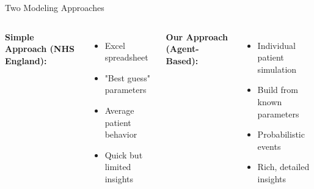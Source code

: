 \documentclass[10pt,aspectratio=169]{beamer}
\begin{document}
\begin{frame}{Two Modeling Approaches}
\begin{columns}[T]
\textbf{Simple Approach (NHS England):}
\begin{itemize}
    \item Excel spreadsheet
    \item "Best guess" parameters
    \item Average patient behavior
    \item Quick but limited insights
\end{itemize}

\textbf{Our Approach (Agent-Based):}
\begin{itemize}
    \item Individual patient simulation
    \item Build from known parameters
    \item Probabilistic events
    \item Rich, detailed insights
\end{itemize}
\end{columns}

\vspace{0.5cm}
\centering
{}
\end{frame}
\end{document}
